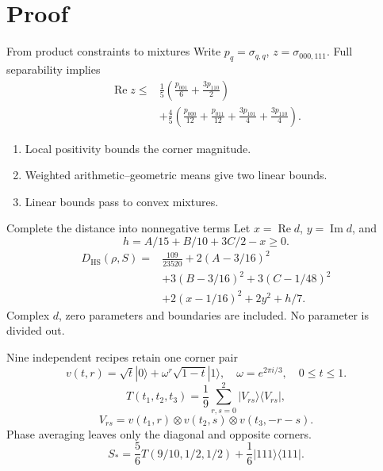 \documentclass{beamer}
\begin{document}
\section{Proof}
\begin{frame}{From product constraints to mixtures}
Write $p_q=\sigma_{q,q}$, $z=\sigma_{000,111}$. Full separability implies
\[
\begin{split}
\operatorname{Re}z\le{}&\frac15\left(\frac{p_{001}}6+\frac{3p_{110}}2\right)\\
&+\frac45\left(\frac{p_{000}}{12}+\frac{p_{011}}{12}
+\frac{3p_{101}}4+\frac{3p_{110}}4\right).
\end{split}
\]
\begin{enumerate}
\item Local positivity bounds the corner magnitude.
\item Weighted arithmetic--geometric means give two linear bounds.
\item Linear bounds pass to convex mixtures.
\end{enumerate}
\end{frame}
\begin{frame}{Complete the distance into nonnegative terms}
Let $x=\operatorname{Re}d$, $y=\operatorname{Im}d$, and
\[
h=A/15+B/10+3C/2-x\ge0.
\]
\[
\begin{aligned}
D_{\mathrm{HS}}(\rho,S)={}&\frac{109}{23520}+2(A-3/16)^2\\
&+3(B-3/16)^2+3(C-1/48)^2\\
&+2(x-1/16)^2+2y^2+h/7.
\end{aligned}
\]
Complex $d$, zero parameters and boundaries are included. No parameter is divided out.
\end{frame}
\begin{frame}{Nine independent recipes retain one corner pair}
\[
v(t,r)=\sqrt t|0\rangle+\omega^r\sqrt{1-t}|1\rangle,
\quad\omega=e^{2\pi i/3},\quad0\le t\le1.
\]
\[
T(t_1,t_2,t_3)=\frac19\sum_{r,s=0}^2|V_{rs}\rangle\langle V_{rs}|,
\]
\[
V_{rs}=v(t_1,r)\otimes v(t_2,s)\otimes v(t_3,-r-s).
\]
Phase averaging leaves only the diagonal and opposite corners.
\[
S_*=\frac56T(9/10,1/2,1/2)+\frac16|111\rangle\langle111|.
\]
\end{frame}
\end{document}
